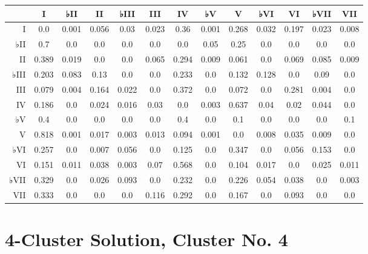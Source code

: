 \begin{table}[htbp]
\begin{minipage}{\linewidth}
\setlength{\tymax}{0.5\linewidth}
\centering
\small
\begin{tabulary}{\textwidth}{@{}RCCCCCCCCCCCC@{}} \toprule
&I&♭II&II&♭III&III&IV&♭V&V&♭VI&VI&♭VII&VII\\
\midrule
I&0.0&0.001&0.056&0.03&0.023&0.36&0.001&0.268&0.032&0.197&0.023&0.008\\
♭II&0.7&0.0&0.0&0.0&0.0&0.0&0.05&0.25&0.0&0.0&0.0&0.0\\
II&0.389&0.019&0.0&0.0&0.065&0.294&0.009&0.061&0.0&0.069&0.085&0.009\\
♭III&0.203&0.083&0.13&0.0&0.0&0.233&0.0&0.132&0.128&0.0&0.09&0.0\\
III&0.079&0.004&0.164&0.022&0.0&0.372&0.0&0.072&0.0&0.281&0.004&0.0\\
IV&0.186&0.0&0.024&0.016&0.03&0.0&0.003&0.637&0.04&0.02&0.044&0.0\\
♭V&0.4&0.0&0.0&0.0&0.0&0.4&0.0&0.1&0.0&0.0&0.0&0.1\\
V&0.818&0.001&0.017&0.003&0.013&0.094&0.001&0.0&0.008&0.035&0.009&0.0\\
♭VI&0.257&0.0&0.007&0.056&0.0&0.125&0.0&0.347&0.0&0.056&0.153&0.0\\
VI&0.151&0.011&0.038&0.003&0.07&0.568&0.0&0.104&0.017&0.0&0.025&0.011\\
♭VII&0.329&0.0&0.026&0.093&0.0&0.232&0.0&0.226&0.054&0.038&0.0&0.003\\
VII&0.333&0.0&0.0&0.0&0.116&0.292&0.0&0.167&0.0&0.093&0.0&0.0\\

\bottomrule

\end{tabulary}
\end{minipage}
\end{table}

\section{4-Cluster Solution, Cluster No. 4}
\label{4-clustersolutionclusterno.4}

